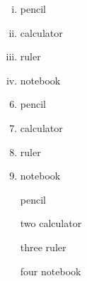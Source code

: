 \documentclass[11pt]{article}
\begin{document}
\vspace{1cm}

\begin{enumerate}[i.]
    \item pencil
    \item calculator
    \item ruler
    \item notebook
\end{enumerate}

\vspace{1cm}

\begin{enumerate} \setcounter{enumi}{5}
    \item pencil
    \item calculator
    \item ruler
    \item notebook
\end{enumerate}

\vspace{1cm}

\begin{enumerate}
    \item[] pencil
    \item[two] calculator
    \item[three] ruler
    \item[four] notebook
\end{enumerate}
\end{document}
